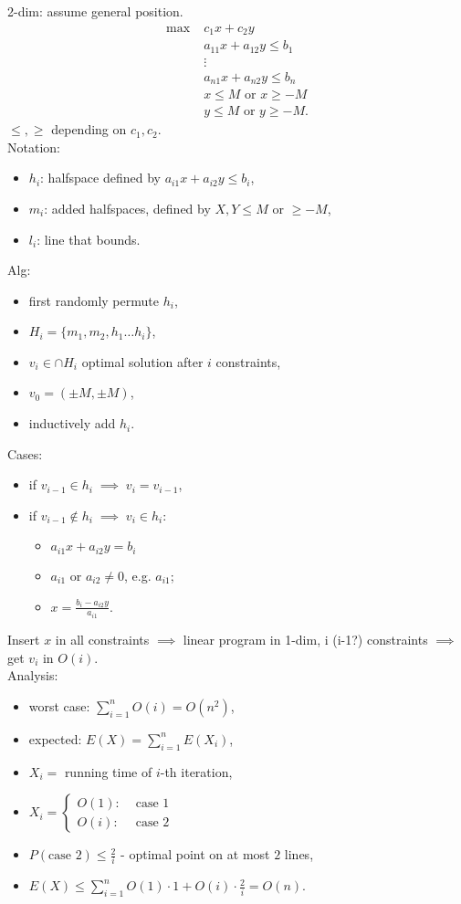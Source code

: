 \documentclass[a4paper, 12pt]{book}
\theoremstyle{definition}
\theoremstyle{remark}
\begin{document}
2-dim: assume general position.
\begin{align*}
  \max \; &c_1 x + c_2 y \\
  &a_{11} x + a_{12} y \leq b_1 \\
  &\vdots \\
  &a_{n1} x + a_{n2} y \leq b_n \\
  &x \leq M \text{ or } x \geq -M \\
  &y \leq M \text{ or } y \geq -M.
\end{align*}
$\leq, \geq$ depending on $c_1, c_2$. \\
Notation:
\begin{itemize}[label={}]
  \item $h_i$: halfspace defined by $a_{i1} x + a_{i2} y \leq b_i$,
  \item $m_i$: added halfspaces, defined by $X, Y \leq M$ or $\geq -M$,
  \item $l_i$: line that bounds.
\end{itemize}
Alg:
\begin{itemize}
  \item first randomly permute $h_i$,
  \item $H_i = \{m_1, m_2, h_1 \dots h_i\}$,
  \item $v_i \in \cap H_i$ optimal solution after $i$ constraints,
  \item $v_0 = (\pm M, \pm M)$,
  \item inductively add $h_i$.
\end{itemize}
Cases:
\begin{itemize}[label={}]
  \item if $v_{i-1} \in h_i \; \implies \; v_i = v_{i-1}$,
  \item if $v_{i-1} \notin h_i \; \implies \; v_i \in h_i$:
    \begin{itemize}[label={}]
      \item $a_{i1} x + a_{i2} y = b_i$
      \item $a_{i1}$ or $a_{i2} \neq 0$, e.g. $a_{i1}$;
      \item $x = \frac{b_i - a_{i2} y}{a_{i1}}$.
    \end{itemize}
\end{itemize}
Insert $x$ in all constraints $\implies$ linear program in 1-dim, i (i-1?) constraints
$\implies$ get $v_i$ in $O(i)$. \\
Analysis:
\begin{itemize}
  \item worst case: $\sum_{i=1}^{n} O(i) = O(n^2)$,
  \item expected: $E(X) = \sum_{i=1}^{n} E(X_i)$,
  \item $X_i =$ running time of $i$-th iteration,
  \item $X_i = \begin{cases}O(1): &\text{ case 1} \\ O(i): &\text{ case 2}\end{cases}$
  \item $P(\text{case 2}) \leq \frac{2}{i}$ - optimal point on at most $2$ lines,
  \item $E(X) \leq \sum_{i=1}^{n} O(1) \cdot 1 + O(i) \cdot \frac{2}{i} = O(n)$.
\end{itemize}
\end{document}
